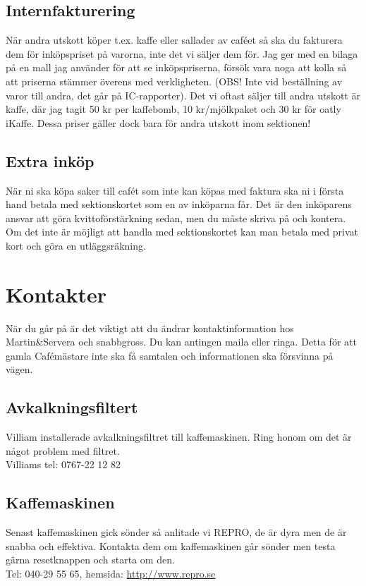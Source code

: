 \documentclass[10pt]{article}
\begin{document}
\subsection{Internfakturering}
När andra utskott köper t.ex. kaffe eller sallader av caféet så ska du fakturera dem för inköpspriset på varorna, inte det vi säljer dem för. Jag ger med en bilaga på en mall jag använder för att se inköpspriserna, försök vara noga att kolla så att priserna stämmer överens med verkligheten. (OBS! Inte vid beställning av varor till andra, det går på IC-rapporter). Det vi oftast säljer till andra utskott är kaffe, där jag tagit 50 kr per kaffebomb, 10 kr/mjölkpaket och 30 kr för oatly iKaffe. Dessa priser gäller dock bara för andra utskott inom sektionen!

\subsection{Extra inköp}
När ni ska köpa saker till cafét som inte kan köpas med faktura ska ni i första hand betala med sektionskortet som en av inköparna får. Det är den inköparens ansvar att göra kvittoförstärkning sedan, men du måste skriva på och kontera. Om det inte är möjligt att handla med sektionskortet kan man betala med privat kort och göra en utläggsräkning.

\section{Kontakter}
När du går på är det viktigt att du ändrar kontaktinformation hos Martin\&Servera och snabbgross. Du kan antingen maila eller ringa. Detta för att gamla Cafémästare inte ska få samtalen och informationen ska försvinna på vägen.

\subsection*{Avkalkningsfiltert}
Villiam installerade avkalkningsfiltret till kaffemaskinen. Ring honom om det är något problem med filtret. \\
Villiams tel: 0767-22 12 82

\subsection*{Kaffemaskinen}
Senast kaffemaskinen gick sönder så anlitade vi REPRO, de är dyra men de är snabba och effektiva. Kontakta dem om kaffemaskinen går sönder men testa gärna resetknappen och starta om den.\\
Tel: 040-29 55 65, hemsida: \url{http://www.repro.se}
\end{document}
